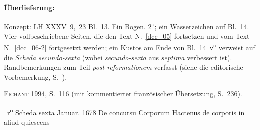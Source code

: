 %
%
%
%
%
\frenchspacing%
%
\begin{ledgroupsized}[r]{120mm}%
\footnotesize%
\pstart%
\noindent\textbf{Überlieferung:}
\pend%
\end{ledgroupsized}%
\begin{ledgroupsized}[r]{114mm}%
\footnotesize%
\pstart \parindent -6mm%
%
Konzept: LH XXXV~9,~23 Bl.~13.
Ein Bogen. 2\textsuperscript{o};
ein Wasserzeichen auf Bl.~14.
Vier vollbeschriebene Seiten,
die den Text N.~\ref{dcc_05} %
fortsetzen
und vom Text N.~\ref{dcc_06-2} %
fortgesetzt werden;
ein Kustos am Ende von Bl.~14~v\textsuperscript{o} verweist auf die \textit{Scheda secundo-sexta} (wobei \textit{secundo-sexta} aus \textit{septima} verbessert ist).
Randbemerkungen zum Teil \textit{post reformationem} verfasst (siehe die editorische Vorbemerkung, S.~).
\pend%
\end{ledgroupsized}%
%
\begin{ledgroupsized}[r]{114mm}%
\footnotesize%
\pstart \parindent -6mm%
%
\textsc{Fichant} 1994, S.~116\cite{01056}
(mit kommentierter französischer Übersetzung, S.~236).
\pend%
\end{ledgroupsized}%
%
%
\frenchspacing%
\count{}%
\count{}%
\count{}
%
%
\vspace{8mm}
\pstart%
\normalsize%
\noindent%
%
~r\textsuperscript{o}\rbrack%
\hspace{47mm}
Scheda sexta%
\protect{}%
\hspace{37mm}
Januar. 1678
\pend%
\pstart%
\noindent%
\centering%
De concursu Corporum%
\protect{}
\pend%
\vspace{0.5em}%
%
\pstart%
\noindent
Hactenus de corporis in aliud quiescens%
